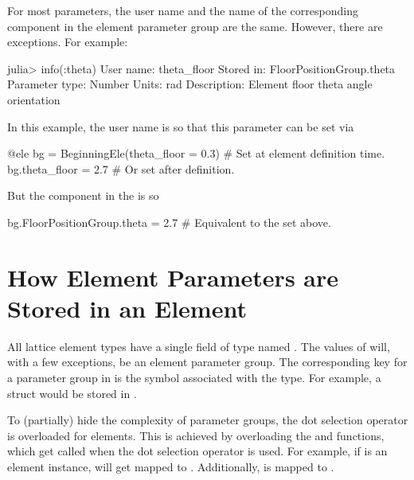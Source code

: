 For most parameters, the user name and the name of the corresponding component in the element parameter
group are the same. However, there are exceptions. For example:
\begin{example}
  julia> info(:theta)
    User name:       theta_floor
    Stored in:       FloorPositionGroup.theta
    Parameter type:  Number
    Units:           rad
    Description:     Element floor theta angle orientation
\end{example}
In this example, the user name is  so that this parameter can be set via
\begin{example}
  @ele bg = BeginningEle(theta_floor = 0.3)    # Set at element definition time.
  bg.theta_floor = 2.7                         # Or set after definition.
\end{example}
But the component in the  is  so
\begin{example}
  bg.FloorPositionGroup.theta = 2.7   # Equivalent to the set above.
\end{example}

\section{How Element Parameters are Stored in an Element}
\label{s:ele.access}

All lattice element types have a single field of type  named .
The values of  will, with a few exceptions, be an
element parameter group. The corresponding key for a parameter group in  is the symbol associated 
with the type. For example, a  struct would be stored in .

To (partially) hide the complexity of parameter groups, the dot selection operator is overloaded for elements.
This is achieved by overloading the  and  functions, 
which get called when the dot selection operator is used.
For example, if  is an element instance,  will get mapped to .
Additionally,  is mapped to .

